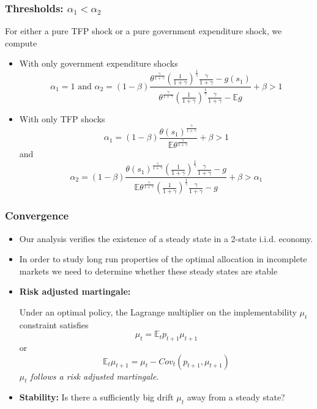 \documentclass{beamer}
\newcommand{\EE}{\mathbb E}
\begin{document}
\begin{frame}
 \frametitle{Thresholds: $\alpha_1 <\alpha_2$}
	For either a pure TFP shock or a pure government expenditure shock,  we compute %
	\begin{itemize}
		\item With only government expenditure shocks
		\[
			\alpha_1 = 1 \text{  and }  \alpha_2 = (1-\beta)\frac{\theta^\frac{\gamma}{1+\gamma}\left(\frac{1}{1+\gamma}\right)^\frac1\gamma\frac{\gamma}{1+\gamma}-g(s_1)}{\theta^\frac{\gamma}{1+\gamma}\left(\frac{1}{1+\gamma}\right)^\frac1\gamma\frac{\gamma}{1+\gamma}-\EE g} +\beta>1
		\]
		\item With only TFP shocks
		\[
			\alpha_1 = (1-\beta)\frac{\theta(s_1)^\frac{\gamma}{1+\gamma}}{\EE\theta^\frac{\gamma}{1+\gamma}}+\beta > 1
		\]and
		\[
		\alpha_2 = (1-\beta)\frac{\theta(s_1)^\frac{\gamma}{1+\gamma}\left(\frac{1}{1+\gamma}\right)^\frac1\gamma\frac{\gamma}{1+\gamma}-g}{\EE\theta^\frac{\gamma}{1+\gamma}\left(\frac{1}{1+\gamma}\right)^\frac1\gamma\frac{\gamma}{1+\gamma}-g}+\beta>\alpha_1
		\]
	\end{itemize}
 \end{frame}


 \begin{frame}
  \frametitle{Convergence}
  \begin{itemize}
		\item Our analysis verifies the existence of a steady state in a 2-state i.i.d. economy.
		\item In order to study long run properties of the optimal allocation in incomplete markets we need to determine whether these steady states are stable 
		\item \textbf{Risk adjusted martingale:}
		
		Under an optimal policy, the Lagrange multiplier on the implementability $\mu_t$ constraint satisfies
		\[
			\mu_t = \EE_t p_{t+1} \mu_{t+1}
		\] or
		\[
		\EE_t  \mu_{t+1}	= \mu_t -Cov_t (p_{t+1}, \mu_{t+1})
		\]
			\emph{$\mu_t$ follows a risk adjusted martingale.}
	
		\item \textbf{Stability: } Is there a sufficiently big drift  $\mu_t$  away from a steady state?
		\end{itemize}
	
 \end{frame}
\end{document}
